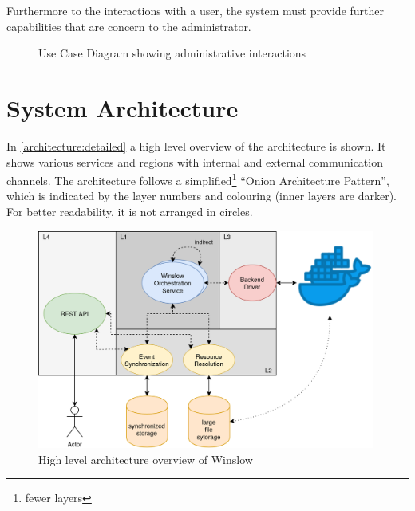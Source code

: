 Furthermore to the interactions with a user, the system must provide further capabilities that are  concern to the administrator.


\begin{figure}[H]
	\centering
	\caption{Use Case Diagram showing administrative interactions}
	\label{use_case:admin}
\end{figure}



\pagebreak
\section{System Architecture}

In \autoref{architecture:detailed} a high level overview of the architecture is shown.
It shows various services and regions with internal and external communication channels.
The architecture follows a simplified\footnote{fewer layers} \enquote{Onion Architecture Pattern}\cite{palermo:onion}, which is indicated by the layer numbers and colouring (inner layers are darker).
For better readability, it is not arranged in circles.


\begin{figure}[H]
	\includegraphics[width=0.99\textwidth]{architecture_detailed.png}
	\centering
	\caption{High level architecture overview of Winslow}
	\label{architecture:detailed}
\end{figure}

